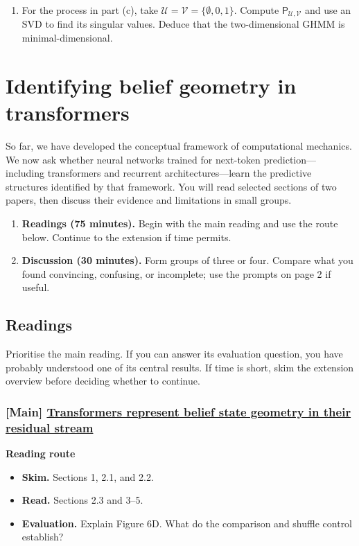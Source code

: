 \documentclass[11pt]{article}
\begin{document}
\begin{exercise}
\begin{enumerate}
\begin{enumerate}
        \item For the process in part (c), take
          $\mathcal U=\mathcal V=\{\emptyset,0,1\}$. Compute
          $\mathsf P_{\mathcal U,\mathcal V}$ and use an SVD to find its
          singular values. Deduce that the two-dimensional GHMM is
          minimal-dimensional.
      \end{enumerate}

  \end{enumerate}
\end{exercise}


\section{Identifying belief geometry in transformers}\label{sec:belief-geometry}

So far, we have developed the conceptual framework of computational mechanics.
We now ask whether neural networks trained for next-token prediction---including
transformers and recurrent architectures---learn the predictive structures
identified by that framework. You will read selected sections of two papers,
then discuss their evidence and limitations in small groups.

\begin{callout}
  \begin{enumerate}
    \item \textbf{Readings (75 minutes).} Begin with the main reading and use
      the route below. Continue to the extension if time permits.
    \item \textbf{Discussion (30 minutes).} Form groups of three or four.
      Compare what you found convincing, confusing, or incomplete; use the
      prompts on page 2 if useful.
  \end{enumerate}
\end{callout}

\subsection{Readings}
Prioritise the main reading. If you can answer its evaluation question, you
have probably understood one of its central results. If time is short, skim
the extension overview before deciding whether to continue.

\subsubsection{[Main] \href{https://arxiv.org/pdf/2405.15943}{Transformers represent belief state geometry in their residual stream}}
  \textbf{Reading route}
\begin{itemize}
    \item \textbf{Skim.} Sections 1, 2.1, and 2.2.
    \item \textbf{Read.} Sections 2.3 and 3--5.
    \item \textbf{Evaluation.} Explain Figure 6D. What do the comparison and
      shuffle control establish?
  \end{itemize}
\end{document}
